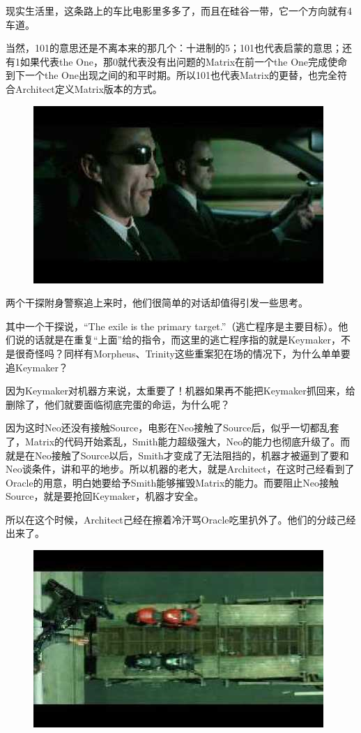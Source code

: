 \documentclass{ctexart}
\begin{document}
现实生活里，这条路上的车比电影里多多了，而且在硅谷一带，它一个方向就有4车道。

当然，101的意思还是不离本来的那几个：十进制的5；101也代表启蒙的意思；还有1如果代表the One，那0就代表没有出问题的Matrix在前一个the One完成使命到下一个the One出现之间的和平时期。所以101也代表Matrix的更替，也完全符合Architect定义Matrix版本的方式。

\begin{figure}[htb]
\centering
\includegraphics[width=0.5\linewidth]{fig/read_reloaded-133}
\end{figure}

两个干探附身警察追上来时，他们很简单的对话却值得引发一些思考。

其中一个干探说，“The exile is the primary target.”（逃亡程序是主要目标）。他们说的话就是在重复“上面”给的指令，而这里的逃亡程序指的就是Keymaker，不是很奇怪吗？同样有Morpheus、Trinity这些重案犯在场的情况下，为什么单单要追Keymaker？

因为Keymaker对机器方来说，太重要了！机器如果再不能把Keymaker抓回来，给删除了，他们就要面临彻底完蛋的命运，为什么呢？

因为这时Neo还没有接触Source，电影在Neo接触了Source后，似乎一切都乱套了，Matrix的代码开始紊乱，Smith能力超级强大，Neo的能力也彻底升级了。而就是在Neo接触了Source以后，Smith才变成了无法阻挡的，机器才被逼到了要和Neo谈条件，讲和平的地步。所以机器的老大，就是Architect，在这时己经看到了Oracle的用意，明白她要给予Smith能够摧毁Matrix的能力。而要阻止Neo接触Source，就是要抢回Keymaker，机器才安全。

所以在这个时候，Architect己经在擦着冷汗骂Oracle吃里扒外了。他们的分歧己经出来了。

\begin{figure}[htb]
\centering
\includegraphics[width=0.5\linewidth]{fig/read_reloaded-134}
\end{figure}
\end{document}
